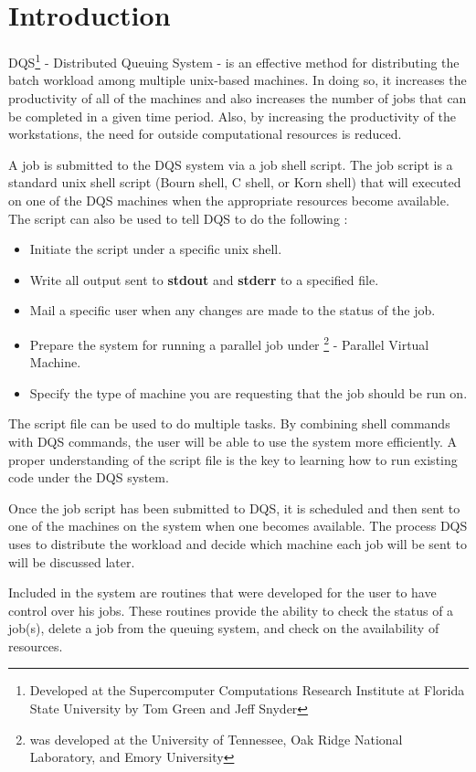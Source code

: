 \section{Introduction}

DQS\footnote{Developed at the Supercomputer Computations Research
Institute at Florida State University by Tom Green and Jeff Snyder} -
Distributed Queuing System - is an effective method for
distributing the batch workload among multiple unix-based machines.  In
doing so, it increases the productivity of all of the machines and
also increases the number of jobs that can be completed in a given
time period.  Also, by increasing the productivity of the
workstations, the need for outside computational resources is reduced.

A job is submitted to the DQS system via a job shell script.
The job script is a standard unix shell script (Bourn shell, C shell, or
Korn shell) that will executed on one of the DQS machines when the
appropriate resources become available.
The script can also be used to tell DQS to do the
following :
\begin{itemize}
\item Initiate the script under a specific unix shell.
\item Write all output sent to {\bf stdout} and {\bf stderr} to a
specified file.
\item Mail a specific user when any changes are made to the status of
the job.
\item Prepare the system for running a parallel job under
\pvm\footnote{\pvm was developed at the University of Tennessee, Oak
Ridge National Laboratory, and Emory University} - Parallel Virtual
Machine.
\item Specify the type of machine you are requesting that the
job should be run on.
\end{itemize}
The script file can be used to do multiple tasks.  By
combining shell commands with DQS commands, the user will be able to
use the system more efficiently.  A proper understanding of the script
file is the key to learning how to run existing code under the DQS
system.

Once the job script has been submitted to DQS, it is scheduled
and then sent to one of the machines on the system when one
becomes available.  The process DQS uses
to distribute the workload and decide which machine each job will be
sent to will be
discussed later.

Included in the system are routines that were developed
for the user to have control over his jobs.  These routines provide the
ability to check the status of a job(s), delete a job from the queuing
system, and check on the availability of resources.

